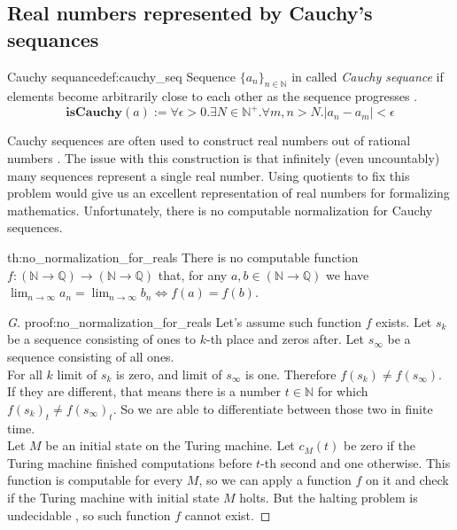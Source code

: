 \subsection{Real numbers represented by Cauchy's sequances}
\begin{defi}{Cauchy sequance}{def:cauchy_seq}
Sequence $\{a_n\}_{n\in \mathbb{N}}$ in called \emph{Cauchy sequance} if  elements become arbitrarily close to each other as the sequence progresses \cite{Anal}.
$$
    \textbf{isCauchy}(a) := \forall \epsilon > 0. \exists N \in \mathbb{N}^+. \forall m, n > N. |a_n - a_m| < \epsilon
$$
\end{defi}
Cauchy sequences are often used to construct real numbers out of rational numbers \cite{CauchyReals}. The issue with this construction is that infinitely (even uncountably) many sequences represent a single real number. Using quotients to fix this problem would give us an excellent representation of real numbers for formalizing mathematics. Unfortunately, there is no computable normalization for Cauchy sequences.

\begin{theo}{}{th:no_normalization_for_reals}
There is no computable function $f: (\mathbb{N} \rightarrow \mathbb{Q}) \rightarrow (\mathbb{N} \rightarrow \mathbb{Q})$ that, for any $a, b \in (\mathbb{N} \rightarrow \mathbb{Q})$ we have $\lim_{n \rightarrow \infty}a_n = \lim_{n \rightarrow \infty}b_n \iff f(a) = f(b)$.
\end{theo}

\begin{proof}[G]{}{proof:no_normalization_for_reals}
Let's assume such function $f$ exists.
Let $s_k$ be a sequence consisting of ones to $k$-th place and zeros after. Let $s_\infty$ be a sequence consisting of all ones. \\For all $k$ limit of $s_k$ is zero, and limit of $s_\infty$ is one. Therefore $f(s_k) \not = f(s_\infty)$. If they are different, that means there is a number $t \in \mathbb{N}$ for which $f(s_k)_t \not = f(s_\infty)_t$. So we are able to differentiate between those two in finite time.\\
Let $M$ be an initial state on the Turing machine. Let $c_M(t)$ be zero if the Turing machine finished computations before $t$-th second and one otherwise. This function is computable for every $M$, so we can apply a function $f$ on it and check if the Turing machine with initial state $M$ holts. But the halting problem is undecidable \cite{Undecidable}, so such function $f$ cannot exist. \contradiction
\end{proof}

